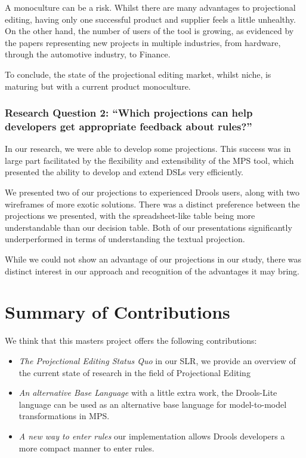 A monoculture can be a risk.
Whilst there are many advantages to projectional editing, having only one successful product and supplier feels a little unhealthy.
On the other hand, the number of users of the tool is growing, as evidenced by the papers representing new projects in multiple industries, from hardware, through the automotive industry, to Finance.

To conclude, the state of the projectional editing market, whilst niche, is maturing but with a current product monoculture.

\subsubsection{Research Question 2: ``Which projections can help developers get appropriate feedback about rules?''}

In our research, we were able to develop some projections.  
This success was in large part facilitated by the flexibility and extensibility of the MPS tool, which presented the ability to develop and extend DSLs very efficiently.

We presented two of our projections to experienced Drools users, along with two wireframes of more exotic solutions.
There was a distinct preference between the projections we presented, with the spreadsheet-like table being more understandable than our decision table.
Both of our presentations significantly underperformed in terms of understanding the textual projection.

While we could not show an advantage of our projections in our study, there was distinct interest in our approach and recognition of the advantages it may bring.

\section{Summary of Contributions}

We think that this masters project offers the following contributions:
\begin{itemize}
    \item \emph{The Projectional Editing Status Quo} in our SLR, we provide an overview of the current state of research in the field of Projectional Editing
    \item \emph{An alternative Base Language} with a little extra work, the Drools-Lite language can be used as an alternative base language for model-to-model transformations in MPS.
    \item \emph{A new way to enter rules} our implementation allows Drools developers a more compact manner to enter rules.
\end{itemize}

